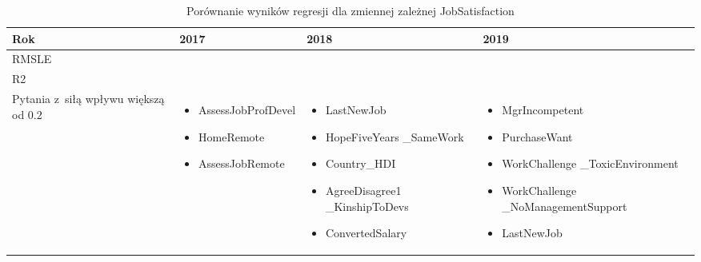\noindent\begin{minipage}{\textwidth}
             \begin{table}[H]
                 \raggedright\caption{Porównanie wyników regresji dla zmiennej zależnej JobSatisfaction\label{tabela:JobSatisfactionRegression}}
                 \begin{center}
                     \begin{tabular}{|P{.1\textwidth}|P{.26\textwidth}|P{.26\textwidth}|P{.26\textwidth}|}

                         \hline
                         Rok   & 2017             & 2018             & 2019             \\
                         \hline
                         RMSLE &  &  &  \\
                         \hline
                         R2    &    &    &    \\
                         \hline
                         Pytania z~siłą wpływu większą od 0.2 &
                         \begin{itemize}
                             \item AssessJobProfDevel
                             \item HomeRemote
                             \item AssessJobRemote
                         \end{itemize} &
                         \begin{itemize}
                             \item LastNewJob
                             \item HopeFiveYears \_SameWork
                             \item Country\_HDI
                             \item AgreeDisagree1 \_KinshipToDevs
                             \item ConvertedSalary
                         \end{itemize} &
                         \begin{itemize}
                             \item MgrIncompetent
                             \item PurchaseWant
                             \item WorkChallenge \_ToxicEnvironment
                             \item WorkChallenge \_NoManagementSupport
                             \item LastNewJob
                         \end{itemize} \\
                         \hline
                     \end{tabular}
                 \end{center}
                 \raggedright\source{\ownwork}
                 \vspace{0.75cm}
             \end{table}
\end{minipage}

